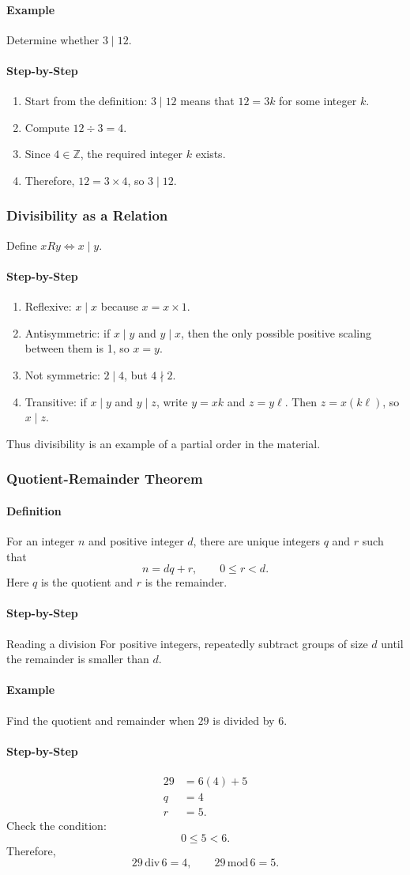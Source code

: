 \documentclass[12pt]{article}
\newcommand{\Definition}{\paragraph{Definition}}
\newcommand{\Step}{\paragraph{Step-by-Step}}
\newcommand{\Example}{\paragraph{Example}}
\begin{document}
\Example
Determine whether $3\mid12$.

\Step
\begin{enumerate}
    \item Start from the definition: $3\mid12$ means that $12=3k$ for some integer $k$.
    \item Compute $12\div3=4$.
    \item Since $4\in\mathbb Z$, the required integer $k$ exists.
    \item Therefore, $12=3\times4$, so $3\mid12$.
\end{enumerate}

\subsubsection{Divisibility as a Relation}
Define $xRy\iff x\mid y$.

\Step
\begin{enumerate}
    \item Reflexive: $x\mid x$ because $x=x\times1$.
    \item Antisymmetric: if $x\mid y$ and $y\mid x$, then the only possible positive scaling between them is 1, so $x=y$.
    \item Not symmetric: $2\mid4$, but $4\nmid2$.
    \item Transitive: if $x\mid y$ and $y\mid z$, write $y=xk$ and $z=y\ell$. Then $z=x(k\ell)$, so $x\mid z$.
\end{enumerate}
Thus divisibility is an example of a partial order in the material.

\subsubsection{Quotient-Remainder Theorem}
\Definition For an integer $n$ and positive integer $d$, there are unique integers $q$ and $r$ such that
\[
n=dq+r,\qquad 0\le r<d.
\]
Here $q$ is the quotient and $r$ is the remainder.

\Step{Reading a division}
For positive integers, repeatedly subtract groups of size $d$ until the remainder is smaller than $d$.

\Example
Find the quotient and remainder when $29$ is divided by $6$.

\Step
\begin{align*}
29&=6(4)+5\\
q&=4\\
r&=5.
\end{align*}
Check the condition:
\[
0\le5<6.
\]
Therefore,
\[
29\,\mathrm{div}\,6=4,\qquad29\,\mathrm{mod}\,6=5.
\]
\end{document}
